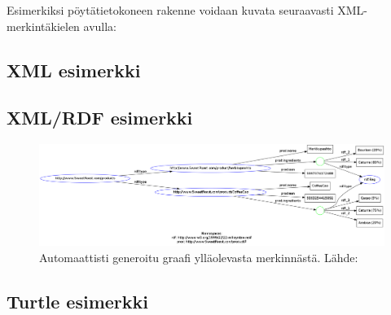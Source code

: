 \documentclass[finnish, 12pt, a4paper, elec, utf8, pdfa, online]{aaltothesis}
\begin{document}
Esimerkiksi pöytätietokoneen rakenne voidaan kuvata seuraavasti XML-merkintäkielen avulla:
\subsection{XML esimerkki}

\vskip 0.75cm

\subsection{XML/RDF esimerkki}


\begin{figure}[htb]
\centering
\includegraphics[width=15cm]{images/xml-rdf-seco.png}
\caption{Automaattisti generoitu graafi ylläolevasta merkinnästä. Lähde:\cite{SeCo_RDF_validator} \label{images/xml-rdf-seco.png}}
\end{figure}
\vskip 0.75cm
\clearpage

\subsection{Turtle esimerkki}

\vskip 0.75cm
\end{document}
